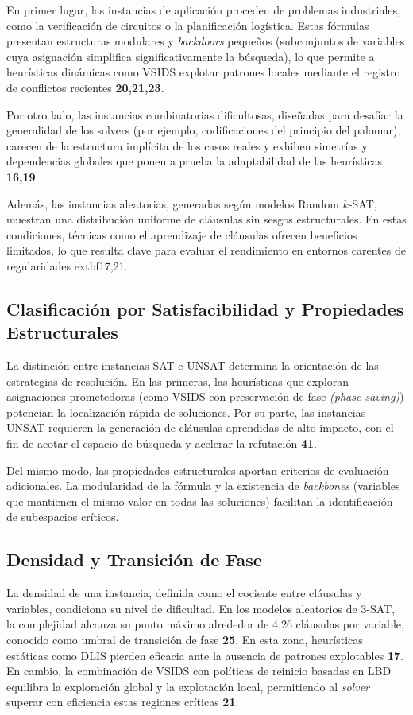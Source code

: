 En primer lugar, las instancias de aplicaci\'on proceden de problemas industriales, como la verificación de circuitos o la planificación logística. Estas fórmulas presentan estructuras modulares y \textit{backdoors} pequeños (subconjuntos de variables cuya asignación simplifica significativamente la búsqueda), lo que permite a heurísticas dinámicas como VSIDS explotar patrones locales mediante el registro de conflictos recientes  \textbf{20,21,23}.

Por otro lado, las instancias combinatorias dificultosas, diseñadas para desafiar la generalidad de los solvers (por ejemplo, codificaciones del principio del palomar), carecen de la estructura implícita de los casos reales y exhiben simetrías y dependencias globales que ponen a prueba la adaptabilidad de las heurísticas  \textbf{16,19}.

Además, las instancias aleatorias, generadas según modelos Random $k$-SAT, muestran una distribución uniforme de cláusulas sin sesgos estructurales. En estas condiciones, técnicas como el aprendizaje de cláusulas ofrecen beneficios limitados, lo que resulta clave para evaluar el rendimiento en entornos carentes de regularidades 	extbf{17,21}.

\subsection{Clasificación por Satisfacibilidad y Propiedades Estructurales}
La distinción entre instancias SAT e UNSAT determina la orientación de las estrategias de resolución. En las primeras, las heurísticas que exploran asignaciones prometedoras (como VSIDS con preservación de fase\textit{ (phase saving)}) potencian la localización rápida de soluciones. Por su parte, las instancias UNSAT requieren la generación de cláusulas aprendidas de alto impacto, con el fin de acotar el espacio de búsqueda y acelerar la refutación \textbf{41}.

Del mismo modo, las propiedades estructurales aportan criterios de evaluación adicionales. La modularidad de la fórmula y la existencia de \textit{backbones} (variables que mantienen el mismo valor en todas las soluciones) facilitan la identificación de subespacios críticos.

\subsection{Densidad y Transición de Fase}
La densidad de una instancia, definida como el cociente entre cláusulas y variables, condiciona su nivel de dificultad. En los modelos aleatorios de 3-SAT, la complejidad alcanza su punto máximo alrededor de 4.26 cláusulas por variable, conocido como umbral de transición de fase \textbf{25}. En esta zona, heurísticas estáticas como DLIS pierden eficacia ante la ausencia de patrones explotables \textbf{17}. En cambio, la combinación de VSIDS con políticas de reinicio basadas en LBD equilibra la exploración global y la explotación local, permitiendo al \textit{solver} superar con eficiencia estas regiones críticas \textbf{21}.


